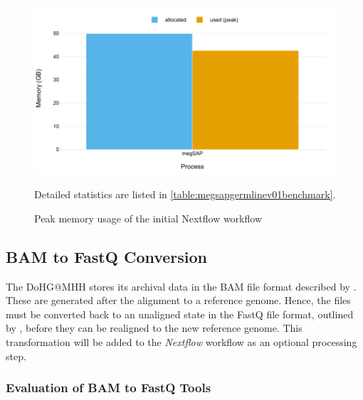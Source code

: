 \begin{figure}[H]
    \centering
	\includegraphics[width=\linewidth,height=\textheight,keepaspectratio]{pipeline_benchmark_memory_v01}
	\caption{Peak memory usage of the initial Nextflow workflow}{Detailed statistics are listed in \cref{table:megsapgermlinev01benchmark}.}
	\label{figure:pipeline_benchmark_memory_v01}
\end{figure}

\subsection{BAM to FastQ Conversion}

The \ac{DoHG@MHH} stores its archival data in the BAM file format described by \citeauthor{Li2009} \autocite{Li2009}. These are generated after the alignment to a reference genome. Hence, the files must be converted back to an unaligned state in the FastQ file format, outlined by \citeauthor{Cock2009} \autocite{Cock2009}, before they can be realigned to the new reference genome. This transformation will be added to the \textit{Nextflow} workflow as an optional processing step. 

\subsubsection{Evaluation of BAM to FastQ Tools}\label{subsubsec:bam2fastqeval}

